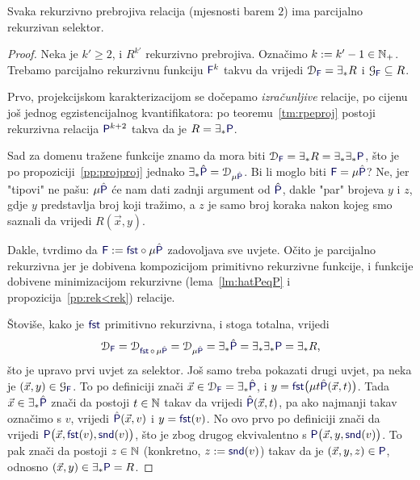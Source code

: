 \begin{lema}\label{lm:tmsel}
Svaka rekurzivno prebrojiva relacija (mjesnosti barem $2$) ima parcijalno rekurzivan selektor.
\end{lema}
\begin{proof}
Neka je $k'\ge2$, i $R^{k'}$ rekurzivno prebrojiva. Označimo $k:=k'-1\in{\mathbb N}_+$. Trebamo parcijalno rekurzivnu funkciju $\f F^k$ takvu da vrijedi $\dom{\f F}=\exists_*R$ i $\graf{\f F}\subseteq R$. 

Prvo, projekcijskom karakterizacijom se dočepamo \emph{izračunljive} relacije, po cijenu još jednog egzistencijalnog kvantifikatora: po teoremu~\ref{tm:rpeproj} postoji rekurzivna relacija $\f P^{k+2}$ takva da je $R=\exists_*\f P$.

Sad za domenu tražene funkcije znamo da mora biti $\dom{\f F}=\exists_*R=\exists_*\exists_*\f P$, što je po propoziciji~\ref{pp:projproj} jednako $\exists_*\hat{\f P}=\dom{\mu\hat{\f P}}$. Bi li moglo biti $\f F=\mu\hat{\f P}$? Ne, jer "tipovi" ne pašu: $\mu\hat{\f P}$ će nam dati zadnji argument od $\hat{\f P}$, dakle "par" brojeva $y$ i $z$, gdje $y$ predstavlja broj koji tražimo, a $z$ je samo broj koraka nakon kojeg smo saznali da vrijedi $R(\vec x,y)$.

Dakle, tvrdimo da $\f F:=\f{fst}\circ\mu\hat{\f P}$ zadovoljava sve uvjete. Očito je parcijalno rekurzivna jer je dobivena kompozicijom primitivno rekurzivne funkcije, i funkcije dobivene minimizacijom rekurzivne (lema~\ref{lm:hatPeqP} i propozicija~\ref{pp:rek<rek}) relacije.

Štoviše, kako je $\f{fst}$ primitivno rekurzivna, i stoga totalna, vrijedi
\begin{equation}
    \dom{\f F}=\dom{\f{fst}\,\circ\,\mu\hat{\f P}}=\dom{\mu\hat{\f P}}=\exists_*\hat{\f P}=\exists_*\exists_*\f P=\exists_*R\text,
\end{equation}
što je upravo prvi uvjet za selektor. Još samo treba pokazati drugi uvjet, pa neka je $(\vec x,y)\in\graf{\f F}$. To po definiciji znači $\vec x\in\dom{\f F}=\exists_*\hat{\f P}$, i
$y=\f{fst}\bigl(\mu t\hat{\f P}(\vec x,t)\bigr)$. Tada $\vec x\in\exists_*\hat{\f P}$ znači da postoji $t\in{\mathbb N}$ takav da vrijedi $\hat{\f P}(\vec x,t)$, 
pa ako najmanji takav označimo s $v$, vrijedi 
$\hat{\f P}(\vec x,v)$ i $y=\f{fst}(v)$. No ovo prvo po definiciji znači da vrijedi $\f P\bigl(\vec x,\f{fst}(v),\f{snd}(v)\bigr)$, što je zbog drugog ekvivalentno s $\f P\bigl(\vec x,y,\f{snd}(v)\bigr)$. To pak znači da postoji $z\in{\mathbb N}$ (konkretno, $z:=\f{snd}(v)$) takav da je $(\vec x,y,z)\in\f P$, odnosno $(\vec x,y)\in\exists_*\f P=R$.
\end{proof}

